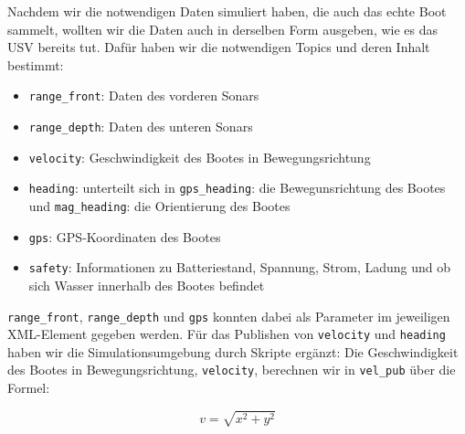 \documentclass[11pt]{article}
\begin{document}
Nachdem wir die notwendigen Daten simuliert haben, die auch das echte Boot sammelt, wollten wir die Daten auch in derselben Form ausgeben, wie es das USV bereits tut. Dafür haben wir die notwendigen Topics und deren Inhalt bestimmt:

\begin{itemize}
	\item \texttt{range\_front}: Daten des vorderen Sonars
	\item \texttt{range\_depth}: Daten des unteren Sonars
	\item \texttt{velocity}: Geschwindigkeit des Bootes in Bewegungsrichtung
	\item \texttt{heading}: unterteilt sich in \texttt{gps\_heading}: die Bewegunsrichtung des Bootes und \texttt{mag\_heading}: die Orientierung des Bootes
	\item \texttt{gps}: GPS-Koordinaten des Bootes
	\item \texttt{safety}: Informationen zu Batteriestand, Spannung, Strom, Ladung und ob sich Wasser innerhalb des Bootes befindet
\end{itemize}
\texttt{range\_front}, \texttt{range\_depth} und \texttt{gps} konnten dabei als Parameter im jeweiligen XML-Element gegeben werden. Für das Publishen von \texttt{velocity} und \texttt{heading} haben wir die Simulationsumgebung durch Skripte ergänzt:
Die Geschwindigkeit des Bootes in Bewegungsrichtung, \texttt{velocity}, berechnen wir in \texttt{vel\_pub} über die Formel:

\begin{equation}
v = \sqrt{x^2+y^2}
\end{equation}
\end{document}
